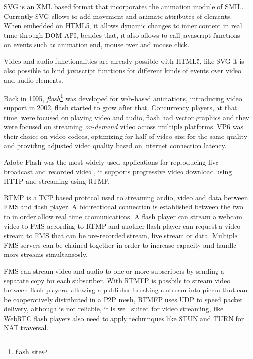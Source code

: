   \ac{SVG} is an \ac{XML} based format that incorporates the animation module of \ac{SMIL}. Currently \ac{SVG} allows to add movement and animate attributes of elements. When embedded on \ac{HTML}5, it allows dynamic changes to inner content in real time through \ac{DOM} \ac{API}, besides that, it also allows to call javascript functions on events such as animation end, mouse over and mouse click.

  Video and audio functionalities are already possible with \ac{HTML}5, like \ac{SVG} it is also possible to bind javascript functions for different kinds of events over video and audio elements.

  Back in 1995, \textit{flash}\footnote{\url{flash site}} was developed for web-based animations, introducing video support in 2002, flash started to grow after that. Concurrency players, at that time, were focused on playing video and audio, flash had vector graphics and they were focused on streaming \textit{on-demand} video across multiple platforms. VP6 was their choice on video codecs, optimizing for half of video size for the same quality and providing adjusted video quality based on internet connection latency. 

  Adobe Flash was the most widely used applications for reproducing live broadcast and recorded video \cite{flashvideo}, it supports progressive video download using \ac{HTTP} and streaming using \ac{RTMP}. 

  \ac{RTMP} is a \ac{TCP} based protocol used to streaming audio, video and data between \ac{FMS} and flash player. A bidirectional connection is established between the two to in order allow real time coomunications. A flash player can stream a webcam video to \ac{FMS} according to \ac{RTMP} and another flash player can request a video stream to \ac{FMS} that can be pre-recorded stream, live stream or data. Multiple \ac{FMS} servers can be chained together in order to increase capacity and handle more streams simultaneosly.

  \ac{FMS} can stream video and audio to one or more subscribers by sending a separate copy for each subscriber. With \ac{RTMFP} is possbile to stream video between flash players, allowing a publisher breaking a stream into pieces that can be cooperatively distributed in a P2P mesh, \ac{RTMFP} uses \ac{UDP} to speed packet delivery, although is not reliable, it is well suited for video streaming, like \ac{WebRTC} flash players also need to apply techninques like \ac{STUN} and \ac{TURN} for \ac{NAT} traversal.

